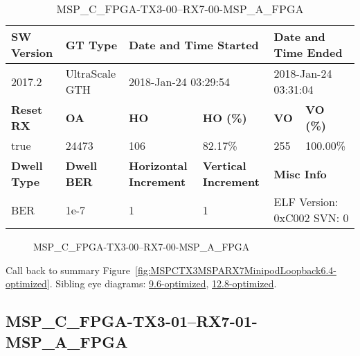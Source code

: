 \begin{table}[h]
\centering
\caption{MSP\_C\_FPGA-TX3-00--RX7-00-MSP\_A\_FPGA}
\label{tab:MSPCFPGATX300RX700MSPAFPGA6.4-optimized}
\begin{tabular}{@{}|l|l|l|l|l|l|@{}}
\toprule
\textbf{SW Version}                & \textbf{GT Type}   & \multicolumn{2}{l|}{\textbf{Date and Time Started}}            & \multicolumn{2}{l|}{\textbf{Date and Time Ended}}        \\ \midrule
2017.2                       & UltraScale GTH          & \multicolumn{2}{l|}{2018-Jan-24 03:29:54}                   & \multicolumn{2}{l|}{2018-Jan-24 03:31:04}               \\ \midrule
\textbf{Reset RX}                  & \textbf{OA} & \textbf{HO}   & \textbf{HO (\%)} & \textbf{VO} & \textbf{VO (\%)} \\ \midrule
true & 24473        & 106          & 82.17\%        & 255        & 100.00\%       \\ \midrule
\textbf{Dwell Type}                & \textbf{Dwell BER} & \textbf{Horizontal Increment} & \textbf{Vertical Increment}    & \multicolumn{2}{l|}{\textbf{Misc Info}}                  \\ \midrule
BER                            & 1e-7        & 1        & 1           & \multicolumn{2}{l|}{ELF Version: 0xC002 SVN: 0}                         \\ \bottomrule
\end{tabular}
\end{table}

\begin{figure}[h]
\caption{MSP\_C\_FPGA-TX3-00--RX7-00-MSP\_A\_FPGA} \label{fig:MSPCFPGATX300RX700MSPAFPGA6.4-optimized}
\end{figure}

Call back to summary Figure~\ref{fig:MSPCTX3MSPARX7MinipodLoopback6.4-optimized}.
Sibling eye diagrams: \hyperref[sec:MSPCFPGATX300RX700MSPAFPGA9.6-optimized]{9.6-optimized}, \hyperref[sec:MSPCFPGATX300RX700MSPAFPGA12.8-optimized]{12.8-optimized}.

\clearpage
\newpage


\subsection{MSP\_C\_FPGA-TX3-01--RX7-01-MSP\_A\_FPGA}\label{sec:MSPCFPGATX301RX701MSPAFPGA6.4-optimized}

